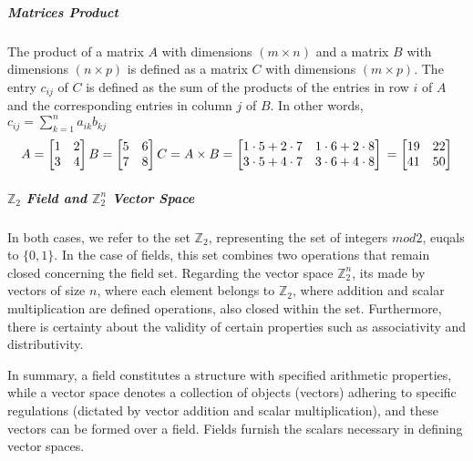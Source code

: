 \subparagraph{Matrices Product}
The product of a matrix $A$ with dimensions $(m \times n)$ and a matrix $B$ with dimensions $(n \times p)$ is defined as a matrix $C$ with dimensions $(m \times p)$. The entry $c_{ij}$ of $C$ is defined as the sum of the products of the entries in row $i$ of $A$ and the corresponding entries in column $j$ of $B$. In other words, $c_{ij} = \sum_{k=1}^n a_{ik} b_{kj}$
$$
A = \begin{bmatrix}
1 & 2 \\
3 & 4
\end{bmatrix} \\
B = \begin{bmatrix}
5 & 6 \\
7 & 8
\end{bmatrix} \\
C = A \times B \\
= \begin{bmatrix}
1 \cdot 5 + 2 \cdot 7 & 1 \cdot 6 + 2 \cdot 8 \\
3 \cdot 5 + 4 \cdot 7 & 3 \cdot 6 + 4 \cdot 8
\end{bmatrix} \\
= \begin{bmatrix}
19 & 22 \\
41 & 50
\end{bmatrix}
$$

\subparagraph{$\mathbb{Z}_2$ Field and $\mathbb{Z}_2^n$ Vector Space}
In both cases, we refer to the set $\mathbb{Z}_2$, representing the set of integers $mod 2$, euqals to $\{0, 1\}$. In the case of fields, this set combines two operations that remain closed concerning the field set. Regarding the vector space $\mathbb{Z}_2^n$, its made by vectors of size $n$, where each element belongs to $\mathbb{Z}_2$, where addition and scalar multiplication are defined operations, also closed within the set. Furthermore, there is certainty about the validity of certain properties such as associativity and distributivity.

In summary, a field constitutes a structure with specified arithmetic properties, while a vector space denotes a collection of objects (vectors) adhering to specific regulations (dictated by vector addition and scalar multiplication), and these vectors can be formed over a field. Fields furnish the scalars necessary in defining vector spaces.

